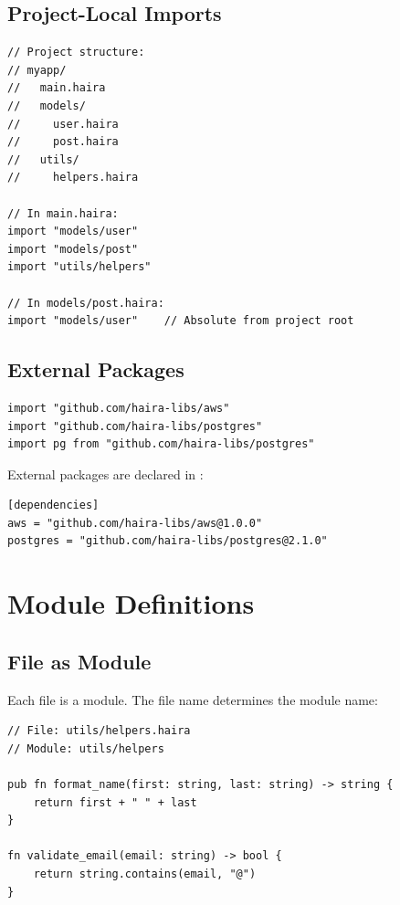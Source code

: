 \subsection{Project-Local Imports}

\begin{lstlisting}
// Project structure:
// myapp/
//   main.haira
//   models/
//     user.haira
//     post.haira
//   utils/
//     helpers.haira

// In main.haira:
import "models/user"
import "models/post"
import "utils/helpers"

// In models/post.haira:
import "models/user"    // Absolute from project root
\end{lstlisting}

\subsection{External Packages}

\begin{lstlisting}
import "github.com/haira-libs/aws"
import "github.com/haira-libs/postgres"
import pg from "github.com/haira-libs/postgres"
\end{lstlisting}

External packages are declared in :

\begin{lstlisting}[language={}]
[dependencies]
aws = "github.com/haira-libs/aws@1.0.0"
postgres = "github.com/haira-libs/postgres@2.1.0"
\end{lstlisting}

\section{Module Definitions}

\subsection{File as Module}

Each  file is a module. The file name determines the module name:

\begin{lstlisting}
// File: utils/helpers.haira
// Module: utils/helpers

pub fn format_name(first: string, last: string) -> string {
    return first + " " + last
}

fn validate_email(email: string) -> bool {
    return string.contains(email, "@")
}
\end{lstlisting}

